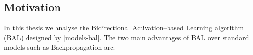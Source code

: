 




\subsection*{Motivation}
In this thesis we analyse the Bidirectional Activation--based Learning algorithm (BAL) designed by \citet{farkas2013bal} \ref{models-bal}. The two main advantages of BAL over standard models such as Backpropagation are: 

